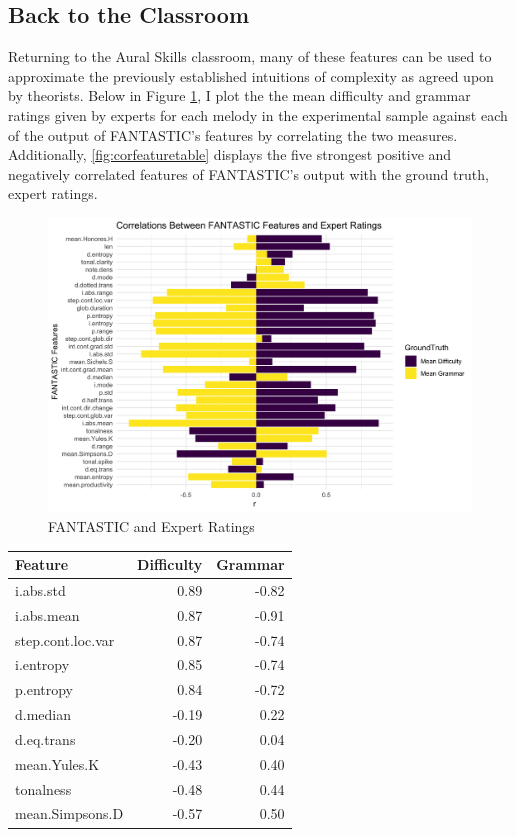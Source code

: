 \documentclass[12pt,]{book}
\begin{document}
\hypertarget{back-to-the-classroom}{%
\subsection{Back to the Classroom}\label{back-to-the-classroom}}

Returning to the Aural Skills classroom, many of these features can be used to approximate the previously established intuitions of complexity as agreed upon by theorists.
Below in Figure \ref{fig:corfeature}, I plot the the mean difficulty and grammar ratings given by experts for each melody in the experimental sample against each of the output of FANTASTIC's features by correlating the two measures.
Additionally, \ref{fig:corfeaturetable} displays the five strongest positive and negatively correlated features of FANTASTIC's output with the ground truth, expert ratings.

\begin{figure}

{\centering \includegraphics[width=1\linewidth]{img/FantasticExpertPlot} 

}

\caption{FANTASTIC and Expert Ratings}\label{fig:corfeature}
\end{figure}

\begin{longtable}[]{@{}lrr@{}}
\toprule
Feature & Difficulty & Grammar\tabularnewline
\midrule
\endhead
i.abs.std & 0.89 & -0.82\tabularnewline
i.abs.mean & 0.87 & -0.91\tabularnewline
step.cont.loc.var & 0.87 & -0.74\tabularnewline
i.entropy & 0.85 & -0.74\tabularnewline
p.entropy & 0.84 & -0.72\tabularnewline
d.median & -0.19 & 0.22\tabularnewline
d.eq.trans & -0.20 & 0.04\tabularnewline
mean.Yules.K & -0.43 & 0.40\tabularnewline
tonalness & -0.48 & 0.44\tabularnewline
mean.Simpsons.D & -0.57 & 0.50\tabularnewline
\bottomrule
\end{longtable}
\end{document}
